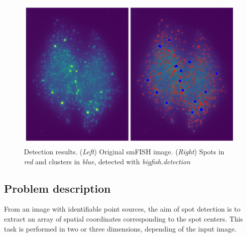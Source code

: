 \begin{figure}[h]
    \centering
    \includegraphics[width=1\textwidth]{figures/chapter2/cluster_detection_results}
	\caption{Detection results.
	(\textit{Left}) Original smFISH image.
	(\textit{Right}) Spots in \textit{red} and clusters in \textit{blue}, detected with \emph{bigfish.detection}}
    \label{fig:detection_results}
\end{figure}

\subsection{Problem description}
\label{subsec:detection}

From an image with identifiable point sources, the aim of spot detection is to extract an array of spatial coordinates corresponding to the spot centers. This task is performed in two or three dimensions, depending of the input image.

